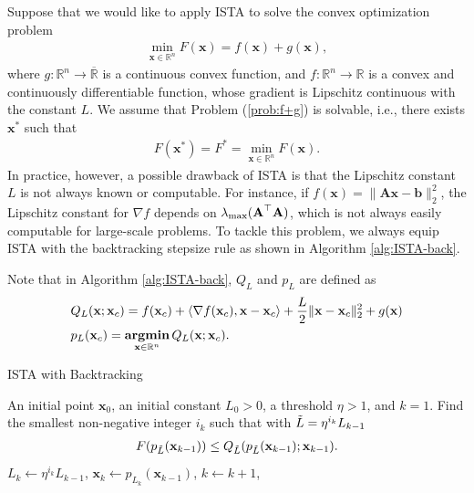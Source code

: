 \documentclass[11pt,letter,notitlepage]{article}
\DeclareMathOperator*{\argmin}{\bf argmin}
\begin{document}
\newpage
\begin{exercise}\label{exercise:ISTA-backtracking}
Suppose that we would like to apply ISTA to solve the convex optimization problem
\begin{align}\label{prob:f+g}
    \min_{\textbf{x}\in\mathbb{R}^n} F(\textbf{x})=f(\textbf{x})+g(\textbf{x}),
\end{align}
where $g:\mathbb{R}^n\to\overline{\mathbb{R}}$ is a continuous convex function, and $f:\mathbb{R}^n\to\mathbb{R}$ is a convex and continuously differentiable function, whose gradient is Lipschitz continuous with the constant $L$. We assume that Problem (\ref{prob:f+g}) is solvable, i.e., there exists $\textbf{x}^*$ such that 
\begin{align*}
    F(\textbf{x}^*)=F^*=\min_{\textbf{x}\in\mathbb{R}^n} F(
    \textbf{x}).
\end{align*}
In practice, however, a possible drawback of ISTA is that the Lipschitz constant $L$ is not always known or computable. For instance, if $f(\textbf{x})=\|\textbf{A}\textbf{x}-\textbf{b}\|_2^2$, the Lipschitz constant for $\nabla f$ depends on $\lambda_{\rm max}(\textbf{A}^\top\textbf{A})$, which is not always easily computable for large-scale problems. To tackle this problem, we always equip ISTA with the backtracking stepsize rule as shown in Algorithm \ref{alg:ISTA-back}. 
\par Note that in Algorithm \ref{alg:ISTA-back}, $Q_L$ and $p_L$ are defined as
\begin{align*}
    &Q_{L}(\textbf{x};\textbf{x}_c)=f(\textbf{x}_c)+\langle\nabla f(\textbf{x}_c),\textbf{x}-\textbf{x}_c\rangle+\frac{L}{2}\|\textbf{x}-\textbf{x}_c\|_2^2+g(\textbf{x})\\
    &p_L(\textbf{x}_c)=\argmin_{\textbf{x}\in\mathbb{R}^n} Q_L(\textbf{x};\textbf{x}_c).
\end{align*}

\begin{algorithm}[H]
	\caption{ISTA with Backtracking}\label{alg:ISTA-back}
	\begin{algorithmic}[1]
		 An initial point $\mathbf{x}_0$, an initial  constant $L_0>0$, a threshold $\eta>1$, and $k=1$.
		    \STATE Find the smallest non-negative integer $i_k$ such that with $\Tilde{L}=\eta^{i_k}L_{k-1}$
		    \begin{align}\label{eqn:FQ}
		        F(p_{\Tilde{L}}(\textbf{x}_{k-1}))\le Q_{\Tilde{L}}(p_{\Tilde{L}}(\textbf{x}_{k-1});\textbf{x}_{k-1}).
		    \end{align}
		    \STATE $L_k\leftarrow \eta^{i_k}L_{k-1}$, $\textbf{x}_k\leftarrow p_{L_k}(\textbf{x}_{k-1})$,
		    \STATE $k \leftarrow k+1$,
		\ENDWHILE
		

\end{algorithmic}
\end{algorithm}
\end{exercise}
\end{document}
